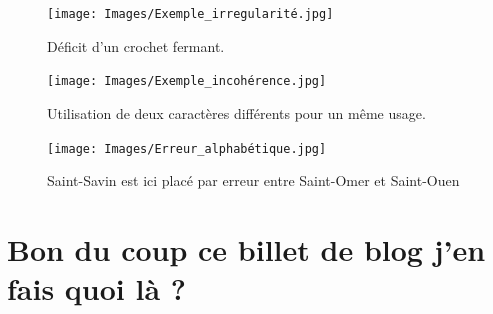 \documentclass[a4paper,12pt,twoside]{book}
\begin{document}
	\begin{figure}
		\centering
		\texttt{[image: Images/Exemple\_irregularité.jpg]}
		\caption{Déficit d'un crochet fermant.}
		\label{Irregularité_crochets}
	\end{figure}

	\begin{figure}
		\centering
		\texttt{[image: Images/Exemple\_incohérence.jpg]}
		\caption{Utilisation de deux caractères différents pour un même usage.}
		\label{Marquage_non_systématique}
	\end{figure}

	\begin{figure}
		\centering
		\texttt{[image: Images/Erreur\_alphabétique.jpg]}
		\caption{\og Saint-Savin\fg{} est ici placé par erreur entre \og Saint-Omer\fg{} et \og Saint-Ouen\fg{}}
		\label{Erreur_alphabétique}
	\end{figure}
	
	\chapter{Bon du coup ce billet de blog j'en fais quoi là ?}
	
	\backmatter
	\listoffigures
	\tableofcontents
	
\end{document}
